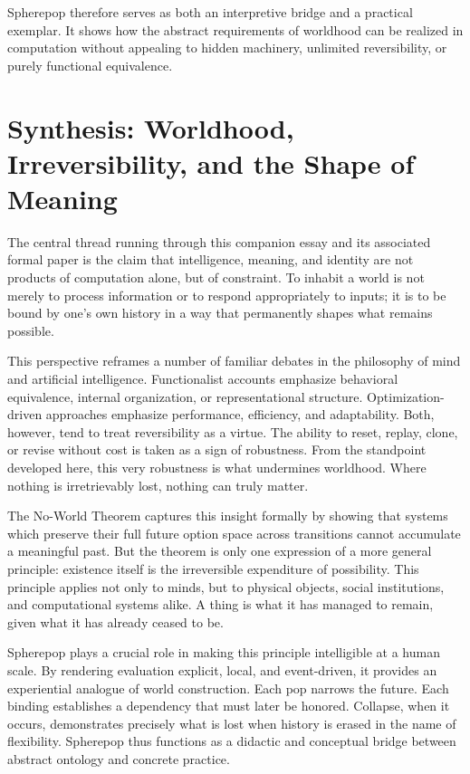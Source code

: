\documentclass[11pt]{article}
\begin{document}
Spherepop therefore serves as both an interpretive bridge and a practical exemplar. It shows how the abstract requirements of worldhood can be realized in computation without appealing to hidden machinery, unlimited reversibility, or purely functional equivalence.

\section{Synthesis: Worldhood, Irreversibility, and the Shape of Meaning}

The central thread running through this companion essay and its associated formal paper is the claim that intelligence, meaning, and identity are not products of computation alone, but of constraint. To inhabit a world is not merely to process information or to respond appropriately to inputs; it is to be bound by one’s own history in a way that permanently shapes what remains possible.

This perspective reframes a number of familiar debates in the philosophy of mind and artificial intelligence. Functionalist accounts emphasize behavioral equivalence, internal organization, or representational structure. Optimization-driven approaches emphasize performance, efficiency, and adaptability. Both, however, tend to treat reversibility as a virtue. The ability to reset, replay, clone, or revise without cost is taken as a sign of robustness. From the standpoint developed here, this very robustness is what undermines worldhood. Where nothing is irretrievably lost, nothing can truly matter.

The No-World Theorem captures this insight formally by showing that systems which preserve their full future option space across transitions cannot accumulate a meaningful past. But the theorem is only one expression of a more general principle: existence itself is the irreversible expenditure of possibility. This principle applies not only to minds, but to physical objects, social institutions, and computational systems alike. A thing is what it has managed to remain, given what it has already ceased to be.

Spherepop plays a crucial role in making this principle intelligible at a human scale. By rendering evaluation explicit, local, and event-driven, it provides an experiential analogue of world construction. Each pop narrows the future. Each binding establishes a dependency that must later be honored. Collapse, when it occurs, demonstrates precisely what is lost when history is erased in the name of flexibility. Spherepop thus functions as a didactic and conceptual bridge between abstract ontology and concrete practice.
\end{document}
